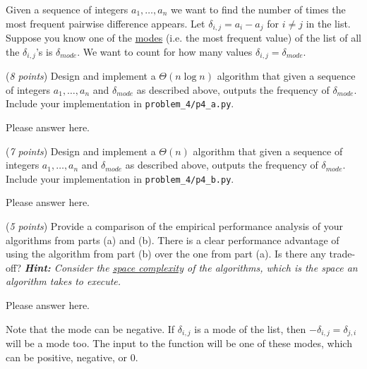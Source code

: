 \documentclass{hw}
\begin{document}
\begin{problem}
  Given a sequence of integers $a_1,\ldots,a_n$ we want to find the
  number of times the most frequent pairwise difference appears.
  Let $\delta_{i, j} = a_i - a_j$ for $i \ne j$ in the list. Suppose you know one of the \href{https://en.wikipedia.org/wiki/Mode_(statistics)}{modes} (i.e. the most frequent value) of the list of all the $\delta_{i, j}$'s is $\delta_{mode}$. We want to count for how many values $\delta_{i, j} = \delta_{mode}$. 

  \begin{subproblem}
    (\textit{8 points})
    Design and implement a $\Theta(n \log n)$ algorithm that given a sequence of integers $a_1,\ldots,a_n$ and $\delta_{mode}$ as described above, outputs the frequency of $\delta_{mode}$. Include your implementation in \texttt{problem\_4/p4\_a.py}.
  \end{subproblem}
  
\begin{solution}
Please answer here.
\end{solution}
  
  \begin{subproblem}
    (\textit{7 points})
    Design and implement a $\Theta(n)$ algorithm that given a sequence of integers $a_1,\ldots,a_n$ and $\delta_{mode}$ as described above, outputs the frequency of $\delta_{mode}$. Include your implementation in \texttt{problem\_4/p4\_b.py}.
  \end{subproblem}

\begin{solution}
Please answer here.
\end{solution}
  
  \begin{subproblem}
    (\textit{5 points})
    Provide a comparison of the empirical performance analysis of your algorithms from parts (a) and (b). There is a clear performance advantage of using the algorithm from part (b) over the one from part (a). Is there any trade-off? \textit{\textbf{Hint:} Consider the \href{https://en.wikipedia.org/wiki/Space_complexity}{space complexity} of the algorithms, which is the space an algorithm takes to execute.}
  \end{subproblem}

\begin{solution}
Please answer here.
\end{solution}
  
  Note that the mode can be negative. If $\delta_{i, j}$ is a mode of the list,
  then $-\delta_{i, j} = \delta_{j, i}$ will be a mode too. The input to the
  function will be one of these modes, which can be positive, negative, or 0.
\end{problem}
\newpage
\end{document}
